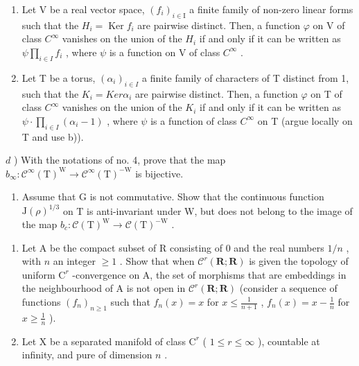 \begin{enumerate}
\begin{enumerate}
\def\labelenumi{\alph{enumi})}
\setcounter{enumi}{1}
\item
  Let V be a real vector space, \((f_{i})_{i\in\mathrm{I}}\) a finite family of non-zero linear forms such that the \(H_{i}=\operatorname{Ker}f_{i}\) are pairwise distinct. Then, a function \(\varphi\) on V of class \(C^{\infty}\) vanishes on the union of the \(H_{i}\) if and only if it can be written as \(\psi\prod_{i\in I}f_{i}\) , where \(\psi\) is a function on V of class \(C^{\infty}\) .
\item
  Let T be a torus, \((\alpha_{i})_{i\in I}\) a finite family of characters of T distinct from 1, such that the \(K_{i} = Ker \alpha_{i}\) are pairwise distinct. Then, a function \(\varphi\) on T of class \(C^{\infty}\) vanishes on the union of the \(K_{i}\) if and only if it can be written as \(\psi \cdot \prod_{i\in I}(\alpha_{i}-1)\) , where \(\psi\) is a function of class \(C^{\infty}\) on T (argue locally on T and use b)).
\end{enumerate}

\(d\) ) With the notations of no. 4, prove that the map \(b_{\infty}:\mathcal{C}^{\infty}(\mathrm{T})^{\mathrm{W}}\to \mathcal{C}^{\infty}(\mathrm{T})^{-\mathrm{W}}\) is bijective.

\begin{enumerate}
\def\labelenumi{\arabic{enumi})}
\setcounter{enumi}{5}
\item
  Assume that G is not commutative. Show that the continuous function \(\mathrm{J}(\rho)^{1/3}\) on T is anti-invariant under W, but does not belong to the image of the map \(b_{c}: \mathcal{C}(\mathrm{T})^{\mathrm{W}} \to \mathcal{C}(\mathrm{T})^{-\mathrm{W}}\) .
\end{enumerate}


\begin{enumerate}
\def\labelenumi{\arabic{enumi})}
\item
  Let A be the compact subset of R consisting of 0 and the real numbers \(1/n\) , with \(n\) an integer \(\geq 1\) . Show that when \(\mathcal{C}^r(\mathbf{R};\mathbf{R})\) is given the topology of uniform \(\mathrm{C}^r\) -convergence on A, the set of morphisms that are embeddings in the neighbourhood of A is not open in \(\mathcal{C}^r(\mathbf{R};\mathbf{R})\) (consider a sequence of functions \((f_n)_{n\geq 1}\) such that \(f_n(x) = x\) for \(x\leq \frac{1}{n + 1}\) , \(f_n(x) = x - \frac{1}{n}\) for \(x\geq \frac{1}{n}\) ).\\
\item
  Let X be a separated manifold of class \(\mathrm{C}^r\) ( \(1\leq r\leq \infty\) ), countable at infinity, and pure of dimension \(n\) .
\end{enumerate}


\end{enumerate}
